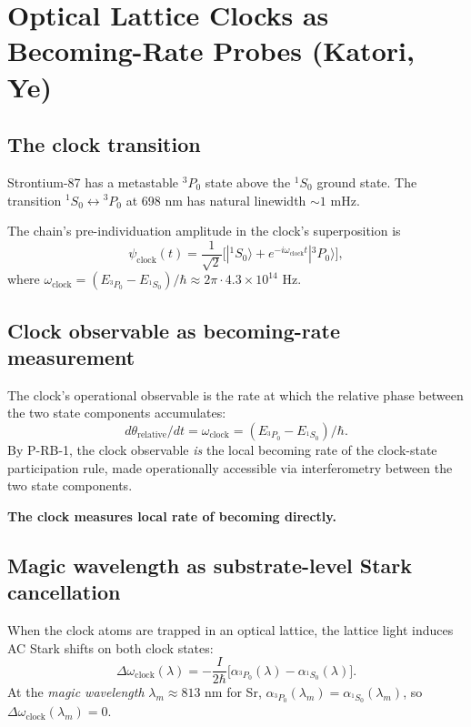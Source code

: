 \documentclass[11pt,a4paper]{article}
\begin{document}
\section{Optical Lattice Clocks as Becoming-Rate Probes (Katori, Ye)}

\subsection{The clock transition}

Strontium-87 has a metastable ${}^3P_0$ state above the ${}^1S_0$ ground state. The transition ${}^1S_0 \leftrightarrow {}^3P_0$ at 698 nm has natural linewidth $\sim 1$ mHz.

The chain's pre-individuation amplitude in the clock's superposition is
\[
\psi_{\mathrm{clock}}(t) = \frac{1}{\sqrt 2}\bigl[|{}^1S_0\rangle + e^{-i\omega_{\mathrm{clock}} t}|{}^3P_0\rangle\bigr],
\]
where $\omega_{\mathrm{clock}} = (E_{{}^3P_0} - E_{{}^1S_0})/\hbar \approx 2\pi\cdot 4.3\times 10^{14}$ Hz.

\subsection{Clock observable as becoming-rate measurement}

The clock's operational observable is the rate at which the relative phase between the two state components accumulates:
\[
d\theta_{\mathrm{relative}}/dt = \omega_{\mathrm{clock}} = (E_{{}^3P_0} - E_{{}^1S_0})/\hbar.
\]
By P-RB-1, the clock observable \emph{is} the local becoming rate of the clock-state participation rule, made operationally accessible via interferometry between the two state components.

\textbf{The clock measures local rate of becoming directly.}

\subsection{Magic wavelength as substrate-level Stark cancellation}

When the clock atoms are trapped in an optical lattice, the lattice light induces AC Stark shifts on both clock states:
\[
\Delta\omega_{\mathrm{clock}}(\lambda) = -\frac{I}{2\hbar}\bigl[\alpha_{{}^3P_0}(\lambda) - \alpha_{{}^1S_0}(\lambda)\bigr].
\]
At the \emph{magic wavelength} $\lambda_m \approx 813$ nm for Sr, $\alpha_{{}^3P_0}(\lambda_m) = \alpha_{{}^1S_0}(\lambda_m)$, so $\Delta\omega_{\mathrm{clock}}(\lambda_m) = 0$.
\end{document}

